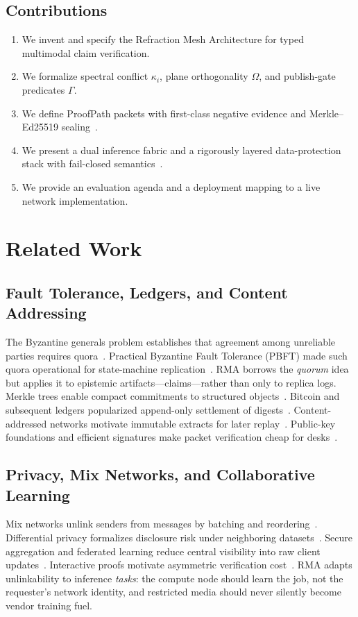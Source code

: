 \documentclass[journal,10pt,twocolumn,a4paper]{IEEEtran}
\begin{document}
\subsection{Contributions}
\begin{enumerate}
  \item We invent and specify the Refraction Mesh Architecture for typed multimodal claim verification.
  \item We formalize spectral conflict $\kappa_i$, plane orthogonality $\Omega$, and publish-gate predicates $\Gamma$.
  \item We define ProofPath packets with first-class negative evidence and Merkle--Ed25519 sealing~\cite{merkle1987digital,edwards25519}.
  \item We present a dual inference fabric and a rigorously layered data-protection stack with fail-closed semantics~\cite{chaum1981mix,bonawitz2017practical,kairouz2021advances}.
  \item We provide an evaluation agenda and a deployment mapping to a live network implementation.
\end{enumerate}

\section{Related Work}
\label{sec:related}

\subsection{Fault Tolerance, Ledgers, and Content Addressing}
The Byzantine generals problem establishes that agreement among unreliable parties requires quora~\cite{lamport1982byzantine}.
Practical Byzantine Fault Tolerance (PBFT) made such quora operational for state-machine replication~\cite{castro1999pbft}.
RMA borrows the \emph{quorum} idea but applies it to epistemic artifacts---claims---rather than only to replica logs.
Merkle trees enable compact commitments to structured objects~\cite{merkle1987digital}.
Bitcoin and subsequent ledgers popularized append-only settlement of digests~\cite{nakamoto2008bitcoin,buterin2014ethereum}.
Content-addressed networks motivate immutable extracts for later replay~\cite{benet2014ipfs}.
Public-key foundations and efficient signatures make packet verification cheap for desks~\cite{diffie1976new,edwards25519}.

\subsection{Privacy, Mix Networks, and Collaborative Learning}
Mix networks unlink senders from messages by batching and reordering~\cite{chaum1981mix}.
Differential privacy formalizes disclosure risk under neighboring datasets~\cite{dwork2006differential}.
Secure aggregation and federated learning reduce central visibility into raw client updates~\cite{bonawitz2017practical,kairouz2021advances}.
Interactive proofs motivate asymmetric verification cost~\cite{goldwasser1989knowledge}.
RMA adapts unlinkability to inference \emph{tasks}: the compute node should learn the job, not the requester's network identity, and restricted media should never silently become vendor training fuel.
\end{document}
